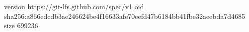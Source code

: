 version https://git-lfs.github.com/spec/v1
oid sha256:a866edcdb3ae246624be4f16633afe70eefd47b6184bb41fbe32aeebda7d4685
size 699236
